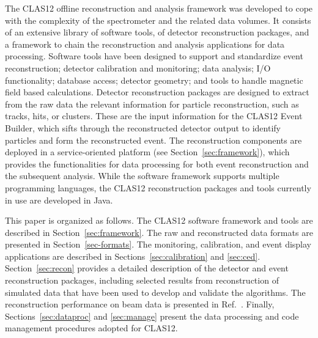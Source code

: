 The CLAS12 offline reconstruction and analysis framework was developed to cope with the complexity of the
spectrometer and the related data volumes. It consists of an extensive library of software tools, of detector
reconstruction packages, and a framework to chain the reconstruction and analysis applications for data
processing. Software tools have been designed to
support and standardize event reconstruction; detector
calibration and monitoring; data analysis; I/O functionality; database access; detector geometry; and tools to handle magnetic field based calculations.  Detector reconstruction packages are designed to
extract from the raw data the relevant information for particle reconstruction, such as tracks, hits, or clusters.
These are the input information for the CLAS12 Event Builder, which sifts through the reconstructed detector
output to identify particles and form the reconstructed event. The reconstruction components are deployed in a
service-oriented platform (see Section~\ref{sec:framework}), which provides the functionalities for data processing for both event reconstruction
and the subsequent analysis. While the software framework supports multiple programming languages, the CLAS12
reconstruction packages and tools currently in use are developed in Java.

This paper is organized as follows. The CLAS12 software framework and tools are described in
Section~\ref{sec:framework}. The raw and reconstructed data formats are presented in Section~\ref{sec-formats}.
The monitoring, calibration, and event display applications are described in Sections~\ref{sec:calibration} and
\ref{sec:ced}. Section~\ref{sec:recon} provides a detailed description of the detector and event reconstruction
packages, including selected results from reconstruction of simulated data that have been used to develop and
validate the algorithms. The reconstruction performance on beam data is presented in Ref.~\cite{clas12-nim}.
Finally, Sections~\ref{sec:dataproc} and \ref{sec:manage} present the data processing and code management
procedures adopted for CLAS12.
